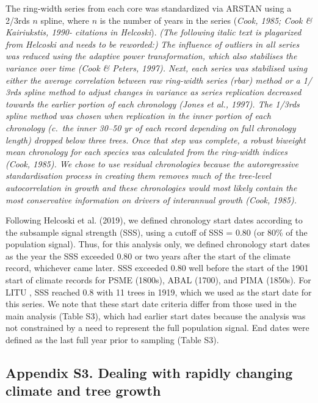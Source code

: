 \documentclass[
]{article}
\begin{document}
The ring-width series from each core was standardized via ARSTAN using a
2/3rds \(n\) spline, where \(n\) is the number of years in the series
(\emph{Cook, 1985; Cook \& Kairiukstis, 1990- citations in Helcoski}).
\emph{(The following italic text is plagarized from Helcoski and needs
to be reworded:)} \emph{The influence of outliers in all series was
reduced using the adaptive power transformation, which also stabilises
the variance over time (Cook \& Peters, 1997). Next, each series was
stabilised using either the average correlation between raw ring-width
series (rbar) method or a 1/ 3rds spline method to adjust changes in
variance as series replication decreased towards the earlier portion of
each chronology (Jones et al., 1997). The 1/3rds spline method was
chosen when replication in the inner portion of each chronology (c.~the
inner 30--50 yr of each record depending on full chronology length)
dropped below three trees. Once that step was complete, a robust
biweight mean chronology for each species was calculated from the
ring-width indices (Cook, 1985). We chose to use residual chronologies
because the autoregressive standardisation process in creating them
removes much of the tree-level autocorrelation in growth and these
chronologies would most likely contain the most conservative information
on drivers of interannual growth (Cook, 1985).}

Following Helcoski et al. (2019), we defined chronology start dates
according to the subsample signal strength (SSS), using a cutoff of SSS
= 0.80 (or 80\% of the population signal). Thus, for this analysis only,
we defined chronology start dates as the year the SSS exceeded 0.80 or
two years after the start of the climate record, whichever came later.
SSS exceeded 0.80 well before the start of the 1901 start of climate
records for PSME (1800s), ABAL (1700), and PIMA (1850s). For LITU , SSS
reached 0.8 with 11 trees in 1919, which we used as the start date for
this series. We note that these start date criteria differ from those
used in the main analysis (Table S3), which had earlier start dates
because the analysis was not constrained by a need to represent the full
population signal. End dates were defined as the last full year prior to
sampling (Table S3).

\newpage

\hypertarget{appendix-s3.-dealing-with-rapidly-changing-climate-and-tree-growth}{%
\subsection{Appendix S3. Dealing with rapidly changing climate and tree
growth}\label{appendix-s3.-dealing-with-rapidly-changing-climate-and-tree-growth}}
\end{document}
